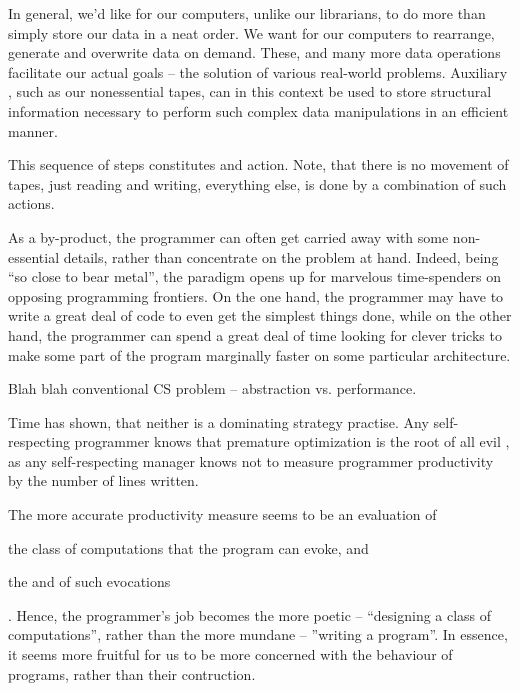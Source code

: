 In general, we'd like for our computers, unlike our librarians, to do more than
simply store our data in a neat order. We want for our computers to rearrange,
generate and overwrite data on demand. These, and many more data operations
facilitate our actual goals -- the solution of various real-world problems.
Auxiliary , such as our nonessential tapes, can in this context
be used to store structural information necessary to perform such complex data
manipulations in an efficient manner.

This sequence of steps constitutes and action. Note, that there is no movement
of tapes, just reading and writing, everything else, is done by a combination
of such actions.







\newpage

As a by-product, the programmer can often get carried away with some
non-essential details, rather than concentrate on the problem at hand. Indeed,
being ``so close to bear metal'', the paradigm opens up for marvelous
time-spenders on opposing programming frontiers. On the one hand, the
programmer may have to write a great deal of code to even get the simplest
things done, while on the other hand, the programmer can spend a great deal of
time looking for clever tricks to make some part of the program marginally
faster on some particular architecture.

Blah blah conventional CS problem -- abstraction vs. performance.

Time has shown, that neither is a dominating strategy practise. Any
self-respecting programmer knows that premature optimization is the root of all
evil \cite{knuth-goto}, as any self-respecting manager knows not to measure
programmer productivity by the number of lines written.


The more accurate productivity measure seems to be an evaluation of
\begin{inparaenum}[(1)] \item the class of computations that the program can
evoke, and \item the  and   of such
evocations\end{inparaenum}. Hence, the programmer's job becomes the more poetic
-- ``designing a class of computations'', rather than the more mundane --
''writing a program''. In essence, it seems more fruitful for us to be more
concerned with the behaviour of programs, rather than their contruction.

